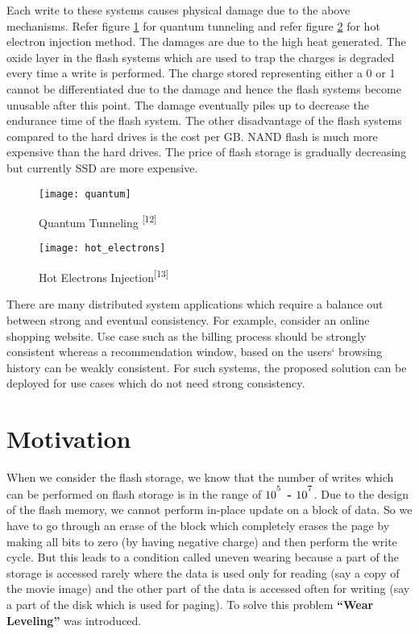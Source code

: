 Each write to these systems causes physical damage due to the above mechanisms. Refer figure \ref{fig:1} for quantum tunneling and refer figure \ref{fig:2} for hot electron injection method. The damages are due to the high heat generated. The oxide layer in the flash systems which are used to trap the charges is degraded every time a write is performed. The charge stored representing either a 0 or 1 cannot be differentiated due to the damage and hence the flash systems become unusable after this point. The damage eventually piles up to decrease the endurance time of the flash system. The other disadvantage of the flash systems compared to the hard drives is the cost per GB. NAND flash is much more expensive than the hard drives. The price of flash storage is gradually decreasing but currently SSD are more expensive.

\begin{figure}[h]
    \centering
    \texttt{[image: quantum]}
    \caption{Quantum Tunneling \textsuperscript{[12]}}
    \label{fig:1}
\end{figure}

\begin{figure}[h]
    \centering
    \texttt{[image: hot\_electrons]}
    \caption{Hot Electrons Injection\textsuperscript{[13]}}
    \label{fig:2}
\end{figure}
There are many distributed system applications which require a balance out between strong and eventual consistency. For example, consider an online shopping website. Use case such as the billing process should be strongly consistent whereas a recommendation window, based on the users` browsing history can be weakly consistent. For such systems, the proposed solution can be deployed for use cases which do not need strong consistency.

\section{Motivation}
When we consider the flash storage, we know that the number of writes which can be performed on flash storage is in the range of \textbf{$10^\textsuperscript{5}$ - $10^\textsuperscript{7}$}.
Due to the design of the flash memory, we cannot perform in-place update on a block of data. So we have to go through an erase of the block which completely erases the page by making all bits to zero (by having negative charge) and then perform the write cycle. But this leads to a condition called uneven wearing because a part of the storage is accessed rarely where the data is used only for reading (say a copy of the movie image) and the other part of the data is accessed often for writing (say a part of the disk which is used for paging). To solve this problem \textbf{“Wear Leveling”} was introduced.
 
